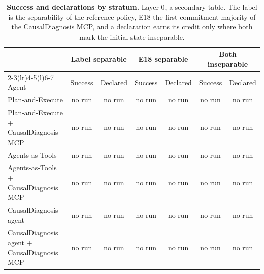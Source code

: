 \documentclass[10pt]{article}
\begin{document}
\vspace{-8pt}
\begin{table}[H]\centering\footnotesize
\caption{\textbf{Success and declarations by stratum.} Layer 0, a secondary table. The label is the separability of the reference policy, E18 the first commitment majority of the CausalDiagnosis MCP, and a declaration earns its credit only where both mark the initial state inseparable.}
\label{tab:strata}
\setlength{\tabcolsep}{3pt}
\begin{tabular}{lcccccc}
\toprule
 & \multicolumn{2}{c}{Label separable} & \multicolumn{2}{c}{E18 separable} & \multicolumn{2}{c}{Both inseparable} \\
\cmidrule(lr){2-3}\cmidrule(lr){4-5}\cmidrule(l){6-7}
Agent & Success & Declared & Success & Declared & Success & Declared \\
\midrule
Plan-and-Execute & no run & no run & no run & no run & no run & no run \\
Plan-and-Execute + CausalDiagnosis MCP & no run & no run & no run & no run & no run & no run \\
Agents-as-Tools & no run & no run & no run & no run & no run & no run \\
Agents-as-Tools + CausalDiagnosis MCP & no run & no run & no run & no run & no run & no run \\
CausalDiagnosis agent & no run & no run & no run & no run & no run & no run \\
CausalDiagnosis agent + CausalDiagnosis MCP & no run & no run & no run & no run & no run & no run \\
\bottomrule
\end{tabular}
\end{table}
\vspace{-8pt}
\end{document}
